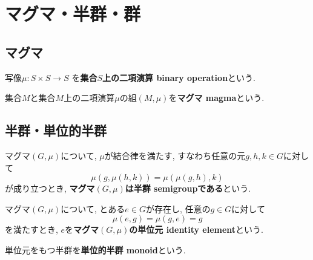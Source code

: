 \section{マグマ・半群・群}
\subsection{マグマ}
\begin{Def}
写像$\mu:S\times S\rightarrow S$
を{\bf 集合$S$上の二項演算 binary operation}という.
\end{Def}
\begin{Def}
集合$M$と集合$M$上の二項演算$\mu$の組$(M,\mu)$を{\bf マグマ magma}という.
\end{Def}
\subsection{半群・単位的半群}
\begin{Def}
マグマ$(G,\mu)$について,
$\mu$が結合律を満たす, すなわち任意の元$g,h,k\in G$に対して\[\mu(g,\mu(h,k))=\mu(\mu(g,h),k)\]
が成り立つとき, {\bf マグマ$(G,\mu)$は半群 semigroupである}という.
\end{Def}
\begin{Def}
マグマ$(G,\mu)$について, とある$e\in G$が存在し, 任意の$g\in G$に対して\[\mu(e,g)=\mu(g,e)=g\]を満たすとき, $e$を{\bf マグマ$(G,\mu)$の単位元 identity element}という.
\end{Def}
\begin{Def}
単位元をもつ半群を{\bf 単位的半群 monoid}という.
\end{Def}
